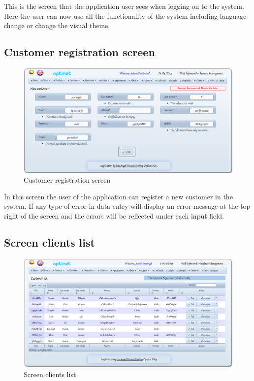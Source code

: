 \documentclass[a4paper,11pt]{book}
\begin{document}
This is the screen that the application user sees when logging on to the system. Here the user can now use all the functionality of the system including language change or change the visual theme.

\subsection {Customer registration screen}

\begin{figure}[!htb]
  \centering
    \includegraphics[scale=0.35]{icapregistrocliente.png}
  \caption{Customer registration screen}
  \label{a}
\end{figure}

In this screen the user of the application can register a new customer in the system. If any type of error in data entry will display an error message at the top right of the screen and the errors will be reflected under each input field.

\subsection {Screen clients list}

\begin{figure}[!htb]
  \centering
    \includegraphics[scale=0.35]{icaplistarclientes.png}
  \caption{Screen clients list}
  \label{a}
\end{figure}
\end{document}
